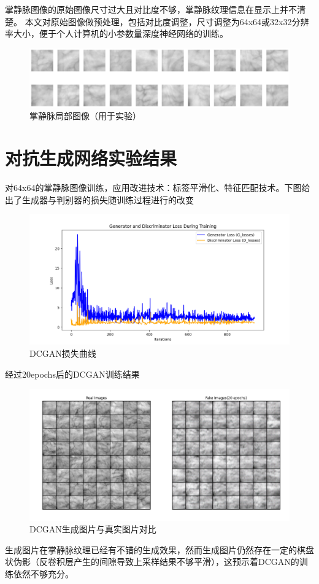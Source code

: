 掌静脉图像的原始图像尺寸过大且对比度不够，掌静脉纹理信息在显示上并不清楚。
本文对原始图像做预处理，包括对比度调整，尺寸调整为64x64或32x32分辨率大小，便于个人计算机的小参数量深度神经网络的训练。

\begin{figure}[!htbp]
    \centering
    \includegraphics[scale = 0.5]{image/chap04/palmvein2.png}
    \caption{掌静脉局部图像（用于实验）}
    \label{fig:palmvein2}
\end{figure}

\section{对抗生成网络实验结果}
对64x64的掌静脉图像训练，应用改进技术：标签平滑化、特征匹配技术。下图给出了生成器与判别器的损失随训练过程进行的改变
\begin{figure}[!htbp]
    \centering
    \includegraphics[scale = 0.5]{image/chap04/GAN/loss.png}
    \caption{DCGAN损失曲线}
    \label{fig:DCGAN_loss}
\end{figure}

经过20epochs后的DCGAN训练结果
\begin{figure}[!htbp]
    \centering
    \includegraphics[width=15cm]{image/chap04/GAN/DCGAN_image.png}
    \caption{DCGAN生成图片与真实图片对比}
    \label{fig:DCGAN_img}
\end{figure}
生成图片在掌静脉纹理已经有不错的生成效果，然而生成图片仍然存在一定的棋盘状伪影（反卷积层产生的间隙导致上采样结果不够平滑），这预示着DCGAN的训练依然不够充分。

